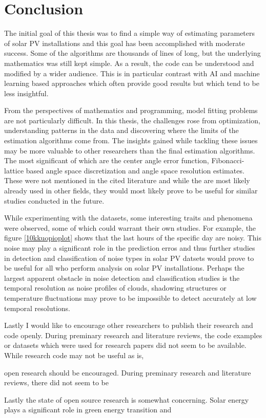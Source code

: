 \chapter{Conclusion}
The initial goal of this thesis was to find a simple way of estimating parameters of solar PV installations and this goal has been accomplished with moderate success. Some of the algorithms are thousands of lines of long, but the underlying mathematics was still kept simple. As a result, the code can be understood and modified by a wider audience. This is in particular contrast with AI and machine learning based approaches which often provide good results but which tend to be less insightful.

From the perspectives of mathematics and programming, model fitting problems are not particularly difficult. In this thesis, the challenges rose from optimization, understanding patterns in the data and discovering where the limits of the estimation algorithms come from. The insights gained while tackling these issues may be more valuable to other researchers than the final estimation algorithms. The most significant of which are the center angle error function, Fibonacci-lattice based angle space discretization and angle space resolution estimates. These were not mentioned in the cited literature and while the are most likely already used in other fields, they would most likely prove to be useful for similar studies conducted in the future.

While experimenting with the datasets, some interesting traits and phenomena were observed, some of which could warrant their own studies. For example, the figure \ref{10kkuopioplot} shows that the last hours of the specific day are noisy. This noise may play a significant role in the prediction erros and thus further studies in detection and classification of noise types in solar PV datsets would prove to be useful for all who perform analysis on solar PV installations. Perhaps the largest apparent obstacle in noise detection and classification studies is the temporal resolution as noise profiles of clouds, shadowing structures or temperature fluctuations may prove to be impossible to detect accurately at low temporal resolutions.

Lastly I would like to encourage other researchers to publish their research and code openly. During preminary research and literature reviews, the code examples or datasets which were used for research papers did not seem to be available. While research code may not be useful as is, 


 open research should be encouraged. During preminary research and literature reviews, there did not seem to be 

Lastly the state of open source research is somewhat concerning. Solar energy plays a significant role in green energy transition and 
